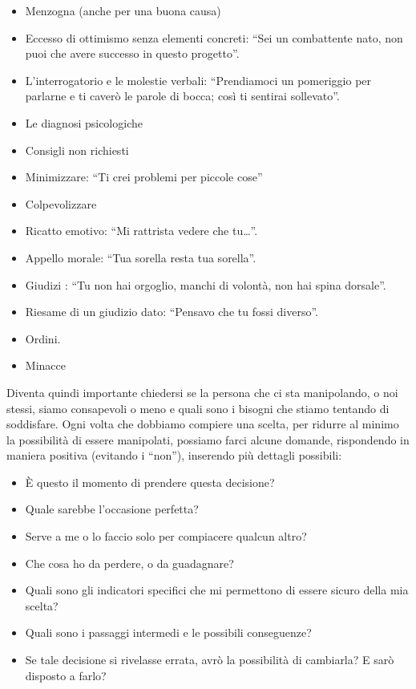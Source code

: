 \documentclass[12pt]{book} %
\begin{document}
\begin{itemize}
\item Menzogna (anche per una buona causa) 
\item Eccesso di ottimismo senza elementi concreti: “Sei un combattente nato, non puoi che avere successo in questo progetto”. 
\item L'interrogatorio e le molestie verbali: “Prendiamoci un pomeriggio per parlarne e ti caverò le parole di bocca; così ti sentirai sollevato”. 
\item Le diagnosi psicologiche
\item Consigli non richiesti
\item Minimizzare: “Ti crei problemi per piccole cose”
\item Colpevolizzare
\item Ricatto emotivo: “Mi rattrista vedere che tu…”. 
\item Appello morale: “Tua sorella resta tua sorella”. 
\item Giudizi : “Tu non hai orgoglio, manchi di volontà, non hai spina dorsale”. 
\item Riesame di un giudizio dato: “Pensavo che tu fossi diverso”. 
\item Ordini. 
\item Minacce
\end{itemize}

\bigskip

Diventa quindi importante chiedersi se la persona che ci sta manipolando, o noi stessi, siamo consapevoli o meno e quali
sono i bisogni che stiamo tentando di soddisfare.
Ogni volta che dobbiamo compiere una scelta, per ridurre al minimo la possibilità di essere manipolati, possiamo farci
alcune domande, rispondendo in maniera positiva (evitando i “non”), inserendo più dettagli possibili:

\begin{itemize}
\item È questo il momento di prendere questa decisione? 
\item Quale sarebbe l'occasione perfetta?
\item Serve a me o lo faccio solo per compiacere qualcun altro? 
\item Che cosa ho da perdere, o da guadagnare? 
\item Quali sono gli indicatori specifici che mi permettono di essere sicuro della mia scelta? 
\item Quali sono i passaggi intermedi e le possibili conseguenze? 
\item Se tale decisione si rivelasse errata, avrò la possibilità di cambiarla? E sarò disposto a farlo?
\end{itemize}
\end{document}
